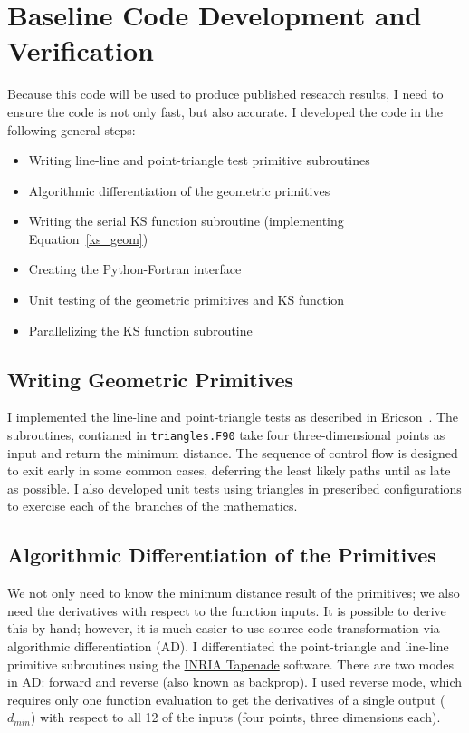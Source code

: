 \documentclass[11pt,letterpaper]{article}
\begin{document}
\section{Baseline Code Development and Verification}
\qquad Because this code will be used to produce published research results, I need to ensure the code is not only fast, but also accurate.
I developed the code in the following general steps:
\begin{itemize}
  \item Writing line-line and point-triangle test primitive subroutines
  \item Algorithmic differentiation of the geometric primitives
  \item Writing the serial KS function subroutine (implementing Equation~\ref{ks_geom})
  \item Creating the Python-Fortran interface
  \item Unit testing of the geometric primitives and KS function
  \item Parallelizing the KS function subroutine
\end{itemize}

\subsection{Writing Geometric Primitives}
\qquad I implemented the line-line and point-triangle tests as described in Ericson~\cite{Ericson:2004:RCD:1121584}. %
The subroutines, contianed in \texttt{triangles.F90} take four three-dimensional points as input and return the minimum distance.
The sequence of control flow is designed to exit early in some common cases, deferring the least likely paths until as late as possible.
I also developed unit tests using triangles in prescribed configurations to exercise each of the branches of the mathematics.

\subsection{Algorithmic Differentiation of the Primitives}
\qquad We not only need to know the minimum distance result of the primitives; we also need the derivatives with respect to the function inputs.
It is possible to derive this by hand; however, it is much easier to use source code transformation via algorithmic differentiation (AD).
I differentiated the point-triangle and line-line primitive subroutines using the \href{https://www-sop.inria.fr/tropics/tapenade.html}{INRIA Tapenade} software.
There are two modes in AD: forward and reverse (also known as backprop).
I used reverse mode, which requires only one function evaluation to get the derivatives of a single output ($d_{min}$) with respect to all 12 of the inputs (four points, three dimensions each).
\end{document}
